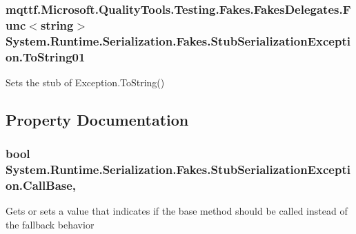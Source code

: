 \hypertarget{class_system_1_1_runtime_1_1_serialization_1_1_fakes_1_1_stub_serialization_exception_a61824efb4ab84b172015cf9dd5ddd10c}{
\subsubsection[{To\-String01}]{\setlength{\rightskip}{0pt plus 5cm}mqttf.\-Microsoft.\-Quality\-Tools.\-Testing.\-Fakes.\-Fakes\-Delegates.\-Func$<$string$>$ System.\-Runtime.\-Serialization.\-Fakes.\-Stub\-Serialization\-Exception.\-To\-String01}}\label{class_system_1_1_runtime_1_1_serialization_1_1_fakes_1_1_stub_serialization_exception_a61824efb4ab84b172015cf9dd5ddd10c}


Sets the stub of Exception.\-To\-String()



\subsection{Property Documentation}
\hypertarget{class_system_1_1_runtime_1_1_serialization_1_1_fakes_1_1_stub_serialization_exception_ae0f99df47686938b81579ffbe96f8723}{
\subsubsection[{Call\-Base}]{\setlength{\rightskip}{0pt plus 5cm}bool System.\-Runtime.\-Serialization.\-Fakes.\-Stub\-Serialization\-Exception.\-Call\-Base\hspace{0.3cm}{\ttfamily [get]}, {\ttfamily [set]}}}\label{class_system_1_1_runtime_1_1_serialization_1_1_fakes_1_1_stub_serialization_exception_ae0f99df47686938b81579ffbe96f8723}


Gets or sets a value that indicates if the base method should be called instead of the fallback behavior

